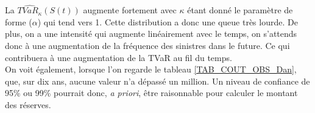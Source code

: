 		La $\widehat{TVaR_{\kappa}}(S(t))$ augmente fortement avec $\kappa$ étant donné le paramètre de forme ($\alpha$) qui tend vers 1. Cette distribution a donc une queue très lourde. De plus, on a une intensité qui augmente linéairement avec le temps, on s'attends donc à une augmentation de la fréquence des sinistres dans le future. Ce qui contribuera à une augmentation de la TVaR au fil du temps.   \\
		
		On voit également, lorsque l'on regarde le tableau \ref{TAB_COUT_OBS_Dan}, que, sur dix ans, aucune valeur n'a dépassé un million. Un niveau de confiance de 95\% ou 99\% pourrait donc, \textit{a priori}, être raisonnable pour calculer le montant des réserves.
